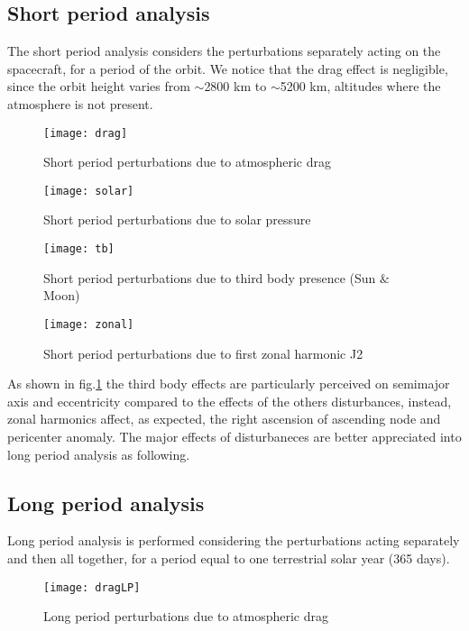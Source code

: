 \subsection{Short period analysis}
The short period analysis considers the perturbations separately acting on the spacecraft, for a period of the orbit. We notice that the drag effect is negligible, since the orbit height varies from $\sim$2800 km to $\sim$5200 km, altitudes where the atmosphere is not present.

\begin{figure}[htp]
\centering
\texttt{[image: drag]}
\caption{Short period perturbations due to atmospheric drag}
\end{figure}

\begin{figure}[htp]
\centering
\texttt{[image: solar]}
\caption{Short period perturbations due to solar pressure}
\end{figure}

\begin{figure}[htp]
\centering
\texttt{[image: tb]}
\caption{Short period perturbations due to third body presence (Sun $\&$ Moon)}
\label{SP3B}
\end{figure}

\begin{figure}[htp]
\centering
\texttt{[image: zonal]}
\caption{Short period perturbations due to first zonal harmonic J2}
\end{figure}

As shown in fig.\ref{SP3B} the third body effects are particularly perceived on semimajor axis and eccentricity compared to the effects of the others disturbances, instead, zonal harmonics affect, as expected, the right ascension of ascending node and pericenter anomaly. The major effects of disturbaneces are better appreciated into long period analysis as following.

\newpage
\subsection{Long period analysis}
Long period analysis is performed considering the perturbations acting separately and then all together, for a period equal to one terrestrial solar year (365 days). 

\begin{figure}[htp]
\centering
\texttt{[image: dragLP]}
\caption{Long period perturbations due to atmospheric drag}
\end{figure}

